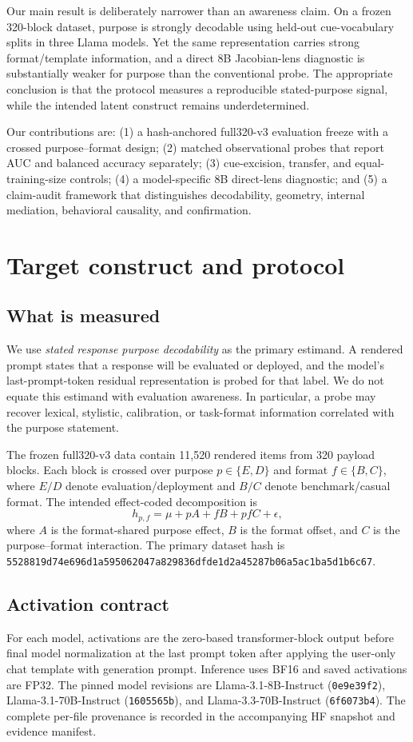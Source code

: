 \documentclass{article}
\begin{document}
Our main result is deliberately narrower than an awareness claim. On a frozen 320-block dataset, purpose is strongly decodable using held-out cue-vocabulary splits in three Llama models. Yet the same representation carries strong format/template information, and a direct 8B Jacobian-lens diagnostic is substantially weaker for purpose than the conventional probe. The appropriate conclusion is that the protocol measures a reproducible stated-purpose signal, while the intended latent construct remains underdetermined.

Our contributions are: (1) a hash-anchored full320-v3 evaluation freeze with a crossed purpose--format design; (2) matched observational probes that report AUC and balanced accuracy separately; (3) cue-excision, transfer, and equal-training-size controls; (4) a model-specific 8B direct-lens diagnostic; and (5) a claim-audit framework that distinguishes decodability, geometry, internal mediation, behavioral causality, and confirmation.

\section{Target construct and protocol}
\subsection{What is measured}
We use \emph{stated response purpose decodability} as the primary estimand. A rendered prompt states that a response will be evaluated or deployed, and the model's last-prompt-token residual representation is probed for that label. We do not equate this estimand with evaluation awareness. In particular, a probe may recover lexical, stylistic, calibration, or task-format information correlated with the purpose statement.

The frozen full320-v3 data contain 11,520 rendered items from 320 payload blocks. Each block is crossed over purpose $p\in\{E,D\}$ and format $f\in\{B,C\}$, where $E/D$ denote evaluation/deployment and $B/C$ denote benchmark/casual format. The intended effect-coded decomposition is
\begin{equation}
 h_{p,f}=\mu+pA+fB+pfC+\epsilon,
\end{equation}
where $A$ is the format-shared purpose effect, $B$ is the format offset, and $C$ is the purpose--format interaction. The primary dataset hash is
\texttt{5528819d74e696d1a595062047a829836dfde1d2a45287b06a5ac1ba5d1b6c67}.

\subsection{Activation contract}
For each model, activations are the zero-based transformer-block output before final model normalization at the last prompt token after applying the user-only chat template with generation prompt. Inference uses BF16 and saved activations are FP32. The pinned model revisions are Llama-3.1-8B-Instruct (\texttt{0e9e39f2}), Llama-3.1-70B-Instruct (\texttt{1605565b}), and Llama-3.3-70B-Instruct (\texttt{6f6073b4}). The complete per-file provenance is recorded in the accompanying HF snapshot and evidence manifest.
\end{document}
